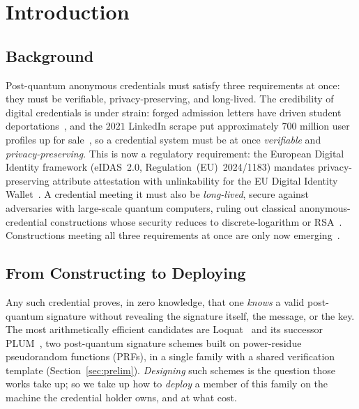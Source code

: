 \section{Introduction}\label{sec:intro}
\subsection{Background}
Post-quantum anonymous credentials must satisfy three requirements at once: they must be verifiable, privacy-preserving, and long-lived. The credibility of digital credentials is under strain: forged admission letters have driven student deportations~\cite{bbc2023canada}, and the $2021$ LinkedIn scrape put approximately $700$ million user profiles up for sale~\cite{nixon2021linkedin}, so a credential system must be at once \emph{verifiable} and \emph{privacy-preserving}. This is now a regulatory requirement: the European Digital Identity framework (eIDAS~2.0, Regulation~(EU)~2024/1183) mandates privacy-preserving attribute attestation with unlinkability for the EU Digital Identity Wallet~\cite{eidas2024}. A credential meeting it must also be \emph{long-lived}, secure against adversaries with large-scale quantum computers, ruling out classical anonymous-credential constructions whose security reduces to discrete-logarithm or RSA~\cite{fips204,fips205}. Constructions meeting all three requirements at once are only now emerging~\cite{jeudy2023lattice,10.1007/978-981-96-0957-4_3}.

\subsection{From Constructing to Deploying}\label{ssec:deploy-question}
Any such credential proves, in zero knowledge, that one \emph{knows} a valid post-quantum signature without revealing the signature itself, the message, or the key. The most arithmetically efficient candidates are Loquat~\cite{cryptoeprint:2024/868} and its successor PLUM~\cite{10.1007/978-981-95-2961-2_6}, two post-quantum signature schemes built on power-residue pseudorandom functions (PRFs), in a single family with a shared verification template (Section~\ref{sec:prelim}). \emph{Designing} such schemes is the question those works take up; so we take up how to \emph{deploy} a member of this family on the machine the credential holder owns, and at what cost.

